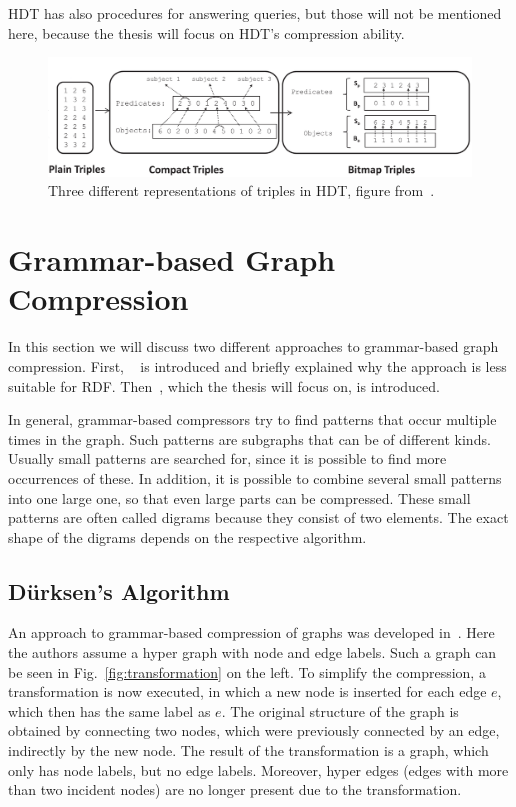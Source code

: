 HDT has also procedures for answering queries, but those will not be mentioned here, because the thesis will focus on HDT's compression ability.




\begin{figure}[h]
	\centering
	\includegraphics[width=1\textwidth]{figures/relatedwork/hdt1}
	\caption{Three different representations of triples in HDT, figure from~\cite{hdt}.}
	\label{fig:hdt_overview}
\end{figure}


\section{Grammar-based Graph Compression}\label{related_work_grammar_based}

In this section we will discuss two different approaches to grammar-based graph compression. First, ~\cite{mattdk} is introduced and briefly explained why the approach is less suitable for RDF. Then~\cite{maneth}, which the thesis will focus on, is introduced.

In general, grammar-based compressors try to find patterns that occur multiple times in the graph. Such patterns are subgraphs that can be of different kinds. Usually small patterns are searched for, since it is possible to find more occurrences of these. In addition, it is possible to combine several small patterns into one large one, so that even large parts can be compressed. These small patterns are often called digrams because they consist of two elements. The exact shape of the digrams depends on the respective algorithm.

\subsection{Dürksen's Algorithm}

An approach to grammar-based compression of graphs was developed in~\cite{mattdk}. Here the authors assume a hyper graph with node and edge labels. Such a graph can be seen in Fig.~\ref{fig:transformation} on the left. To simplify the compression, a transformation is now executed, in which a new node is inserted for each edge $e$, which then has the same label as $e$. The original structure of the graph is obtained by connecting two nodes, which were previously connected by an edge, indirectly by the new node. The result of the transformation is a graph, which only has node labels, but no edge labels. Moreover, hyper edges (edges with more than two incident nodes) are no longer present due to the transformation.

